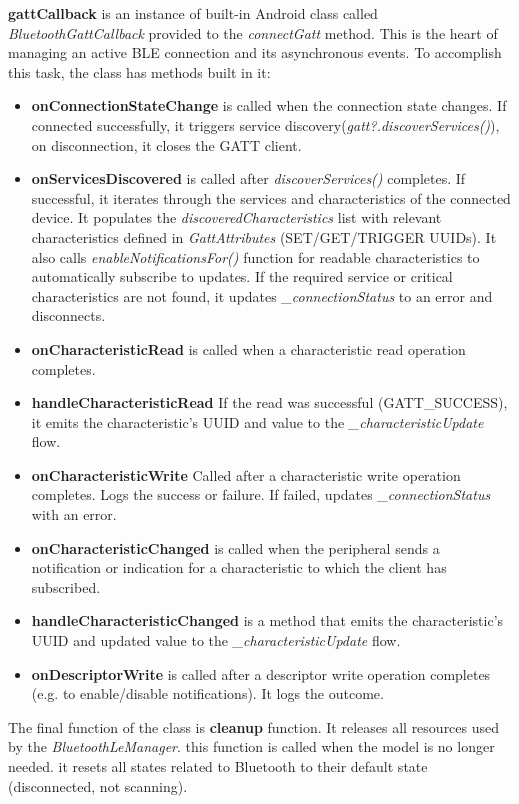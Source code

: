 \textbf{gattCallback} is an instance of built-in Android class called \textit{BluetoothGattCallback}\cite{android_bluetooth} provided to the \textit{connectGatt} method. This is the heart of managing an active \ac{BLE} connection and its asynchronous events. To accomplish this task, the class has methods built in it:
\begin{itemize}
	\item \textbf{onConnectionStateChange} is called when the connection state changes. If connected successfully, it triggers service discovery(\textit{gatt?.discoverServices()}), on disconnection, it closes the \ac{GATT} client.
	\item \textbf{onServicesDiscovered} is called after \textit{discoverServices()} completes. If successful, it iterates through the services and characteristics of the connected device. It populates the \textit{discoveredCharacteristics} list with relevant characteristics defined in \textit{GattAttributes} (SET/GET/TRIGGER UUIDs). It also calls \textit{enableNotificationsFor()} function for readable characteristics to automatically subscribe to updates. If the required service or critical characteristics are not found, it updates \textit{\_connectionStatus} to an error and disconnects.
	\item \textbf{onCharacteristicRead} is called when a characteristic read operation completes. 
	\item \textbf{handleCharacteristicRead} If the read was successful (GATT\_SUCCESS), it emits the characteristic's \ac{UUID} and value to the \textit{\_characteristicUpdate} flow.
	\item \textbf{onCharacteristicWrite} Called after a characteristic write operation completes. Logs the success or failure. If failed, updates \textit{\_connectionStatus} with an error.
	\item \textbf{onCharacteristicChanged} is called when the peripheral sends a notification or indication for a characteristic to which the client has subscribed. 
	\item \textbf{handleCharacteristicChanged} is a method that emits the characteristic's \ac{UUID} and updated value to the \textit{\_characteristicUpdate} flow.
	\item \textbf{onDescriptorWrite} is called after a descriptor write operation completes (e.g. to enable/disable notifications). It logs the outcome.
\end{itemize}
The final function of the class is \textbf{cleanup} function. It releases all resources used by the \textit{BluetoothLeManager}. this function is called when the model is no longer needed. it resets all states related to Bluetooth to their default state (disconnected, not scanning).
